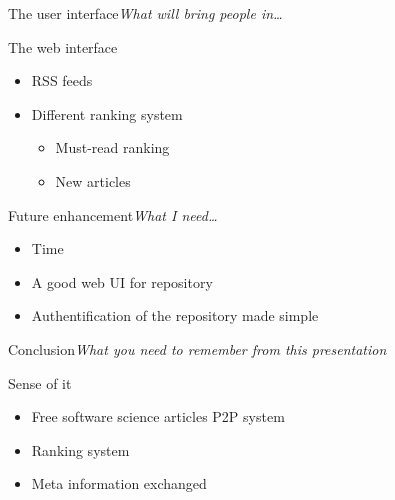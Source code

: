 \begin{frame}{The user interface}{\textit{What will bring people in\ldots}}

\begin{block}{The web interface}
\begin{itemize}
\item RSS feeds
\item Different ranking system
\begin{itemize}
\item Must-read ranking
\item New articles
\end{itemize}
\end{itemize}
\end{block}

\end{frame}


\begin{frame}{Future enhancement}{\textit{What I need\ldots}}

\begin{itemize}
\item Time
\item A good web UI for repository
\item Authentification of the repository made simple
\end{itemize}

\end{frame}



\begin{frame}{Conclusion}{\textit{What you need to remember from this presentation}}

\begin{block}{Sense of it}
\begin{itemize}
\item Free software science articles P2P system
\item Ranking system
\item Meta information exchanged
\end{itemize}
\end{block}

\end{frame}


